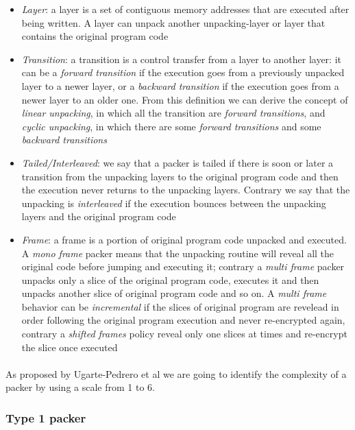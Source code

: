 \begin{itemize}
\item \textit{Layer}: a layer is a set of contiguous memory addresses that are executed after being written. A layer can unpack another unpacking-layer or layer that contains the original program code
\item \textit{Transition}: a transition is a control transfer from a layer to another layer: it can be a \textit{forward transition} if the execution goes from a previously unpacked layer to a newer layer, or a \textit{backward transition} if the execution goes from a newer layer to an older one. From this definition we can derive the concept of \textit{linear unpacking}, in which all the transition are \textit{forward transitions}, and \textit{cyclic unpacking}, in which there are some \textit{forward transitions} and some \textit{backward transitions}
\item \textit{Tailed/Interleaved}: we say that a packer is tailed if there is soon or later a transition from the unpacking layers to the original program code and then the execution never returns to the unpacking layers. Contrary we say that the unpacking is \textit{interleaved} if the execution bounces between the unpacking layers and the original program code
\item \textit{Frame}: a frame is a portion of original program code unpacked and executed. A \textit{mono frame} packer means that the unpacking routine will reveal all the original code before jumping and executing it; contrary a \textit{multi frame} packer unpacks only a slice of the original program code, executes it and then unpacks another slice of original program code and so on. A \textit{multi frame} behavior can be \textit{incremental} if the slices of original program are revelead in order following the original program execution and never re-encrypted again, contrary a \textit{shifted frames} policy reveal only one slices at times and re-encrypt the slice once executed
\end{itemize}

\paragraph{}
As proposed by Ugarte-Pedrero et al\cite{sokpacker} we are going to identify the complexity of a packer by using a scale from 1 to 6.

\subsubsection{Type 1 packer}

